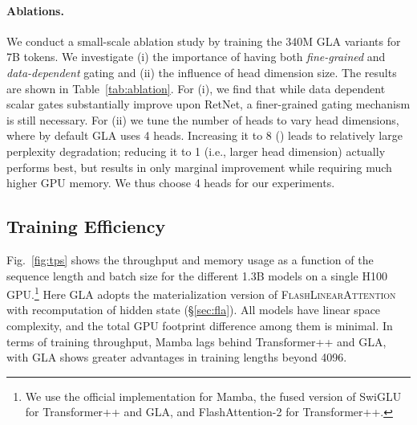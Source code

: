 \paragraph{Ablations.}
We conduct a small-scale ablation study by training the 340M GLA variants for 7B tokens. We investigate (i) the importance of having both \emph{fine-grained} and \emph{data-dependent} gating  and (ii) the influence of head dimension size. The results are shown in Table~\ref{tab:ablation}. For (i), we find that while data dependent scalar gates substantially improve upon RetNet, a finer-grained gating mechanism is still necessary. For (ii) we tune the number of heads to vary head dimensions, where by default GLA uses 4 heads. Increasing it to 8 () leads to relatively large perplexity degradation; reducing it to 1 (i.e., larger head dimension) actually performs best, but results in only marginal improvement while requiring much higher GPU memory. We thus choose 4 heads for our experiments.


\vspace{-2mm}
\subsection{Training Efficiency}
\vspace{-2mm}

Fig.~\ref{fig:tps} shows the throughput and memory usage as a function of the sequence length and batch size for the different 1.3B models on a single H100 GPU.\footnote{We use the official implementation for Mamba, the fused version of SwiGLU  for Transformer++ and GLA, and FlashAttention-2 for Transformer++.} Here GLA adopts the materialization version of \textsc{FlashLinearAttention} with recomputation of hidden state (\S\ref{sec:fla}). All models have linear space complexity, and the total GPU footprint difference among them is minimal. In terms of training throughput, Mamba  lags behind Transformer++ and GLA, with GLA shows greater advantages in training lengths beyond 4096.
%

%
%
%
%

\vspace{-2mm}
